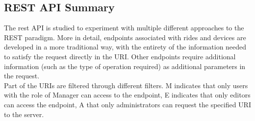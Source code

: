 \subsection{REST API Summary}

The rest API is studied to experiment with multiple different approaches to the REST paradigm. More in detail, endpoints associated with rides and devices are developed in a more traditional way, with the entirety of the information needed to satisfy the request directly in the URI.
Other endpoints require additional information (such as the type of operation required) as additional parameters in the request.\\ 

Part of the URIs are filtered through different filters. M indicates that only users with the role of Manager can access to the endpoint, E indicates that only editors can access the endpoint, A that only administrators can request the specified URI to the server.


